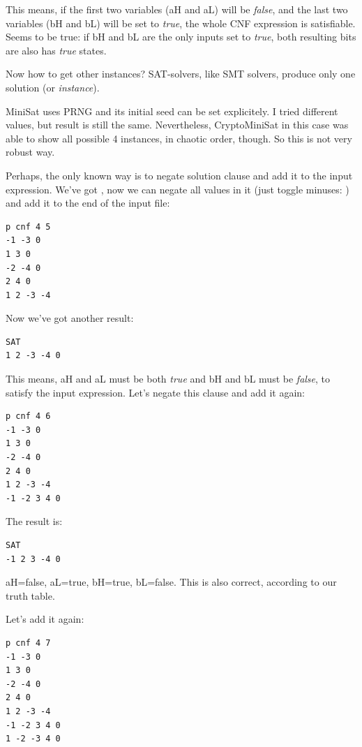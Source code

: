 This means, if the first two variables (aH and aL) will be \textit{false}, and the last two variables (bH and bL) will be set to \textit{true},
the whole \ac{CNF} expression is satisfiable.
Seems to be true: if bH and bL are the only inputs set to \textit{true}, both resulting bits are also has \textit{true} states.

Now how to get other instances? \ac{SAT}-solvers, like \ac{SMT} solvers, produce only one solution (or \textit{instance}).

MiniSat uses \ac{PRNG} and its initial seed can be set explicitely. I tried different values, but result is still the same.
Nevertheless, CryptoMiniSat in this case was able to show all possible 4 instances, in chaotic order, though.
So this is not very robust way.

Perhaps, the only known way is to negate solution clause and add it to the input expression.
We've got , 
now we can negate all values in it (just toggle minuses: ) and add it to the end of the input file:

\begin{lstlisting}
p cnf 4 5
-1 -3 0
1 3 0
-2 -4 0
2 4 0
1 2 -3 -4
\end{lstlisting}

Now we've got another result:

\begin{lstlisting}
SAT
1 2 -3 -4 0
\end{lstlisting}

This means, aH and aL must be both \textit{true} and bH and bL must be \textit{false}, to satisfy the input expression.
Let's negate this clause and add it again:

\begin{lstlisting}
p cnf 4 6
-1 -3 0
1 3 0
-2 -4 0
2 4 0
1 2 -3 -4
-1 -2 3 4 0
\end{lstlisting}

The result is:

\begin{lstlisting}
SAT
-1 2 3 -4 0
\end{lstlisting}

aH=false, aL=true, bH=true, bL=false. This is also correct, according to our truth table.

Let's add it again:

\begin{lstlisting}
p cnf 4 7
-1 -3 0
1 3 0
-2 -4 0
2 4 0
1 2 -3 -4
-1 -2 3 4 0
1 -2 -3 4 0
\end{lstlisting}

